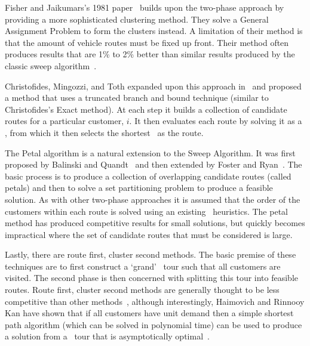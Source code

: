 
Fisher and Jaikumars's 1981 paper~\cite{FJ:1981} builds upon the two-phase approach by providing a more sophisticated clustering method. They solve a General Assignment Problem to form the clusters instead. A limitation of their method is that the amount of vehicle routes must be fixed up front. Their method often produces results that are 1\% to 2\% better than similar results produced by the classic sweep algorithm~\cite{TV2001}. 

Christofides, Mingozzi, and Toth expanded upon this approach in~\cite{CMT:1981} and proposed a method that uses a truncated branch and bound technique (similar to Christofides's Exact method). At each step it builds a collection of candidate routes for a particular customer, $i$. It then evaluates each route by solving it as a \TSP, from which it then selects the shortest \TSP\ as the route.

The Petal algorithm is a natural extension to the Sweep Algorithm. It was first proposed by Balinski and Quandt~\cite{balinski:64} and then extended by Foster and Ryan~\cite{FR:1976}. The basic process is to produce a collection of overlapping candidate routes (called petals) and then to solve a set partitioning problem to produce a feasible solution. As with other two-phase approaches it is assumed that the order of the customers within each route is solved using an existing \TSP\ heuristics. The petal method has produced competitive results for small solutions, but quickly becomes impractical where the set of candidate routes that must be considered is large.  

Lastly, there are route first, cluster second methods. The basic premise of these techniques are to first construct a `grand' \TSP\ tour such that all customers are visited. The second phase is then concerned with splitting this tour into feasible routes. Route first, cluster second methods are generally thought to be less competitive than other methods~\cite{Laporte:1999}, although interestingly, Haimovich and Rinnooy Kan have shown that if all customers have unit demand then a simple shortest path algorithm (which can be solved in polynomial time) can be used to produce a solution from a \TSP\ tour that is asymptotically optimal~\cite{HK:1985}.

